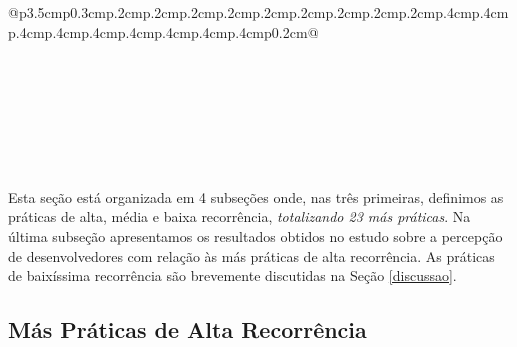 \begin{table*}
\begin{tabular}{@{}p{3.5cm}p{0.3cm}p{.2cm}p{.2cm}p{.2cm}p{.2cm}p{.2cm}p{.2cm}p{.2cm}p{.2cm}p{.2cm}p{.4cm}p{.4cm}p{.4cm}p{.4cm}p{.4cm}p{.4cm}p{.4cm}p{.4cm}p{.4cm}p{0.2cm}@{}}
\hline

 \\
 \\
 \\
 \\
 \\
 \\
\toprule
\end{tabular}
\caption{Lista de práticas de alta, média e baixa recorrência.}
\label{tab:Categories}
\end{table*}

Esta seção está organizada em 4 subseções onde, nas três primeiras, definimos as práticas de alta, média e baixa recorrência, \emph{totalizando 23 más práticas}. Na última subseção apresentamos os resultados obtidos no estudo sobre a percepção de desenvolvedores com relação às más práticas de alta recorrência. As práticas de baixíssima recorrência são brevemente discutidas na Seção \ref{discussao}.

\subsection{Más Práticas de Alta Recorrência}

